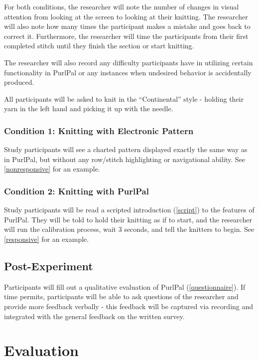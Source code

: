 \documentclass{article}
\begin{document}
For both conditions, the researcher will note the number of changes in visual attention from looking at the screen to looking at their knitting.
The researcher will also note how many times the participant makes a mistake and goes back to correct it.
Furthermore, the researcher will time the participants from their first completed stitch until they finish the section or start knitting.

The researcher will also record any difficulty participants have in utilizing certain functionality in PurlPal or any instances when undesired behavior is accidentally produced.

All participants will be asked to knit in the ``Continental'' style - holding their yarn in the left hand and picking it up with the needle.

\subsubsection{Condition 1: Knitting with Electronic Pattern}

Study participants will see a charted pattern displayed exactly the same way as in PurlPal, but without any row/stitch highlighting or navigational ability. See \ref{nonresponsive} for an example.

\subsubsection{Condition 2: Knitting with PurlPal}

Study participants will be read a scripted introduction (\ref{script}) to the features of PurlPal.
They will be told to hold their knitting as if to start, and the researcher will run the calibration process, wait 3 seconds, and tell the knitters to begin. See \ref{responsive} for an example.

\subsection{Post-Experiment}

Participants will fill out a qualitative evaluation of PurlPal (\ref{questionnaire}).
If time permits, participants will be able to ask questions of the researcher and provide more feedback verbally - this feedback will be captured via recording and integrated with the general feedback on the written survey.

\section{Evaluation}
\end{document}
